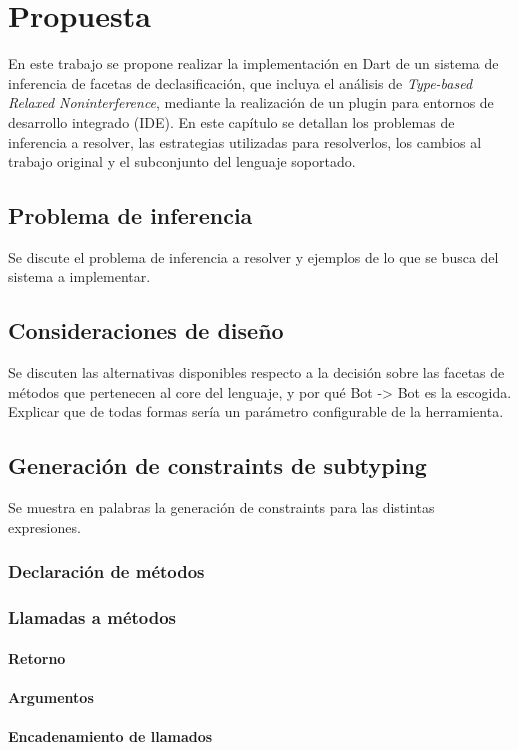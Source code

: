 \chapter{Propuesta}

En este trabajo se propone realizar la implementación en Dart de un sistema de inferencia de facetas de declasificación, que incluya el análisis de \textit{Type-based Relaxed Noninterference}, mediante la realización de un plugin para entornos de desarrollo integrado (IDE). En este capítulo se detallan los problemas de inferencia a resolver, las estrategias utilizadas para resolverlos, los cambios al trabajo original y el subconjunto del lenguaje soportado.

\section{Problema de inferencia}
Se discute el problema de inferencia a resolver y ejemplos de lo que se busca del sistema a implementar.

\section{Consideraciones de diseño}
Se discuten las alternativas disponibles respecto a la decisión sobre las facetas de métodos que pertenecen al core del lenguaje, y por qué Bot -> Bot es la escogida. Explicar que de todas formas sería un parámetro configurable de la herramienta.

\section{Generación de constraints de subtyping}
Se muestra en palabras la generación de constraints para las distintas expresiones.
\subsection{Declaración de métodos}
\subsection{Llamadas a métodos}
\subsubsection{Retorno}
\subsubsection{Argumentos}
\subsubsection{Encadenamiento de llamados}
